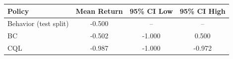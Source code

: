 \begin{tabular}{lccc}
\toprule
Policy & Mean Return & 95\% CI Low & 95\% CI High \\
\midrule
Behavior (test split) & -0.500 & -- & -- \\
BC & -0.502 & -1.000 & 0.500 \\
CQL & -0.987 & -1.000 & -0.972 \\
\bottomrule
\end{tabular}
